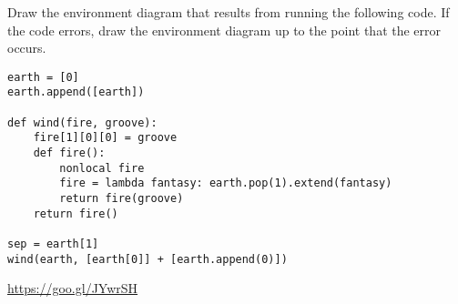 \begin{blocksection}
\question Draw the environment diagram that results from running the following code. If the code errors, draw the environment diagram up to the point that the error occurs.

\begin{lstlisting}
earth = [0]
earth.append([earth])

def wind(fire, groove):
    fire[1][0][0] = groove
    def fire():
        nonlocal fire
        fire = lambda fantasy: earth.pop(1).extend(fantasy)
        return fire(groove)
    return fire()

sep = earth[1]		
wind(earth, [earth[0]] + [earth.append(0)])
\end{lstlisting}

\begin{solution}[1in]
\url{https://goo.gl/JYwrSH}
\end{solution}
\end{blocksection}
